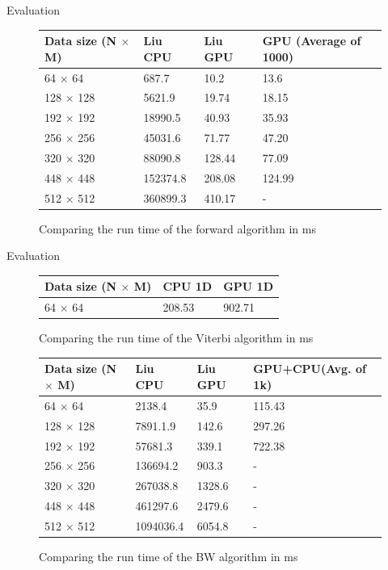 \documentclass[11pt]{beamer}
\begin{document}
\begin{frame}{Evaluation}
\begin{figure}[H]
\centering
\begin{tabular}{|l|l|l|l|}
\hline
Data size (N $\times$ M) & Liu CPU & Liu GPU & GPU (Average of 1000)\\ \hline
64 $\times$ 64 & 687.7 & 10.2 & 13.6 \\ \hline
128 $\times$ 128 & 5621.9 & 19.74 & 18.15 \\ \hline
192 $\times$ 192 & 18990.5 & 40.93 & 35.93 \\ \hline
256 $\times$ 256 & 45031.6 & 71.77 & 47.20 \\ \hline
320 $\times$ 320 & 88090.8 & 128.44 & 77.09 \\ \hline
448 $\times$ 448 & 152374.8 & 208.08 & 124.99 \\ \hline
512 $\times$ 512 & 360899.3 & 410.17 & - \\ \hline

\end{tabular}

\caption{Comparing the run time of the forward algorithm in ms}
\end{figure}
\end{frame}

\begin{frame}{Evaluation}
\begin{figure}[H]
\centering
\begin{tabular}{|l|l|l|}
\hline
Data size (N $\times$ M) & CPU 1D & GPU 1D \\ \hline
64 $\times$ 64 & 208.53 & 902.71 \\ \hline

\end{tabular}

\caption{Comparing the run time of the Viterbi algorithm in ms}
\end{figure}
\end{frame}

\begin{frame}
\begin{figure}[H]
\centering
\begin{tabular}{|l|l|l|l|}
\hline
Data size (N $\times$ M) & Liu CPU & Liu GPU &GPU+CPU(Avg. of 1k)\\ \hline
64 $\times$ 64 & 2138.4 & 35.9 & 115.43 \\ \hline
128 $\times$ 128 & 7891.1.9 & 142.6 & 297.26 \\ \hline
192 $\times$ 192 & 57681.3 & 339.1 & 722.38 \\ \hline
256 $\times$ 256 & 136694.2 & 903.3 & - \\ \hline
320 $\times$ 320 & 267038.8 & 1328.6 & - \\ \hline
448 $\times$ 448 & 461297.6 & 2479.6 & - \\ \hline
512 $\times$ 512 & 1094036.4 & 6054.8 & - \\ \hline

\end{tabular}

\caption{Comparing the run time of the BW algorithm in ms}
\end{figure}
\end{frame}
\end{document}
